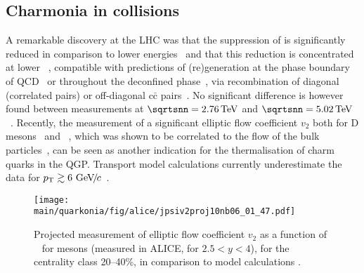 \documentclass[../report.tex]{subfiles}
\providecommand{\main}{..}
\begin{document}
\subsection{Charmonia in \PbPb collisions} %

A remarkable discovery at the LHC was that the suppression of \PJgy is significantly reduced in comparison to lower energies~\cite{Abelev:2012rv} and that this reduction is concentrated at lower \pT~\cite{Abelev:2013ila,Adam:2016rdg}, compatible with predictions of (re)generation at the phase boundary of QCD~\cite{BraunMunzinger:2000px} or throughout the deconfined phase~\cite{Thews:2000rj,Zhao:2011cv,Yan:2006ve}, via recombination of diagonal (correlated pairs) or off-diagonal c$\bar{\text{c}}$ pairs~\cite{Young:2008he}. No significant difference is however found between measurements at $\sqrtsnn = \unit[2.76]{TeV}$ and $\sqrtsnn = \unit[5.02]{TeV}$~\cite{Adam:2016rdg,Sirunyan:2017isk}.
Recently, the measurement of a significant elliptic flow coefficient $v_2$ both for D mesons~\cite{Abelev:2014ipa,Acharya:2017qps,Sirunyan:2017plt} and \PJgy~\cite{Khachatryan:2016ypw,ALICE:2013xna,Acharya:2017tgv,Aaboud:2018ttm,Acharya:2018pjd}, which was shown to be correlated to the flow of the bulk particles~\cite{Acharya:2018bxo,Acharya:2018pjd}, can be seen as another indication for the thermalisation of charm quarks in the QGP. Transport model calculations \cite{Zhou:2014kka,Du:2015wha} currently underestimate the data for $p\sb{\scriptstyle\mathrm{T}}\gtrsim 6~\text{GeV}\!/\mspace{-2mu}c$~\cite{Acharya:2017tgv,Khachatryan:2016ypw,Aaboud:2018ttm}.



  
\begin{figure}[h]
\begin{center}
 \texttt{[image: \\main/quarkonia/fig/alice/jpsiv2proj10nb06\_01\_47.pdf]}
\end{center}
 \caption{Projected measurement of elliptic flow coefficient $v_2$ as a function of \pT~ for \PJgy mesons (measured in ALICE, for $2.5<y<4$), for the centrality class 20--40\%, in comparison to model calculations \cite{Du:2015wha}.}
\label{FigQ:v2pTPbPb}
\end{figure}
\end{document}
